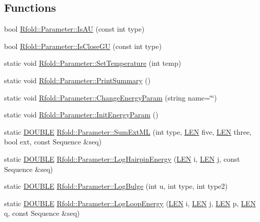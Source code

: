 \subsection*{Functions}
\begin{DoxyCompactItemize}
\item 
bool \hyperlink{namespace_rfold_1_1_parameter_a82faf0dc317bb70000edd3f34bc467b9}{Rfold\+::\+Parameter\+::\+Is\+A\+U} (const int type)
\item 
bool \hyperlink{namespace_rfold_1_1_parameter_a0ed77a73e79acb5e23fbb8f0a93e915f}{Rfold\+::\+Parameter\+::\+Is\+Close\+G\+U} (const int type)
\item 
static void \hyperlink{namespace_rfold_1_1_parameter_a308e1549312d4c50c9701331ef6acf7e}{Rfold\+::\+Parameter\+::\+Set\+Temperature} (int temp)
\item 
static void \hyperlink{namespace_rfold_1_1_parameter_af2fc6f49adcbd2c489ef4afa27c096dc}{Rfold\+::\+Parameter\+::\+Print\+Summary} ()
\item 
static void \hyperlink{namespace_rfold_1_1_parameter_a5d691fc3fd4d8c3633b25eb48ab151d0}{Rfold\+::\+Parameter\+::\+Change\+Energy\+Param} (string name=\char`\"{}\char`\"{})
\item 
static void \hyperlink{namespace_rfold_1_1_parameter_a3c977c57f1a40be353e62f7292eff9e4}{Rfold\+::\+Parameter\+::\+Init\+Energy\+Param} ()
\item 
static \hyperlink{energy__const_8hh_a8747af38b86aa2bbcda2f1b1aa0888c2}{D\+O\+U\+B\+L\+E} \hyperlink{namespace_rfold_1_1_parameter_a56e65afc08cd0ac6ec2af3a0bac07c0d}{Rfold\+::\+Parameter\+::\+Sum\+Ext\+M\+L} (int type, \hyperlink{energy__const_8hh_a05b49c662c073f89e86804f7856622a0}{L\+E\+N} five, \hyperlink{energy__const_8hh_a05b49c662c073f89e86804f7856622a0}{L\+E\+N} three, bool ext, const Sequence \&seq)
\item 
static \hyperlink{energy__const_8hh_a8747af38b86aa2bbcda2f1b1aa0888c2}{D\+O\+U\+B\+L\+E} \hyperlink{namespace_rfold_1_1_parameter_a59afd89fc8f4ec5e7fa0ef0a3e56f302}{Rfold\+::\+Parameter\+::\+Log\+Hairpin\+Energy} (\hyperlink{energy__const_8hh_a05b49c662c073f89e86804f7856622a0}{L\+E\+N} i, \hyperlink{energy__const_8hh_a05b49c662c073f89e86804f7856622a0}{L\+E\+N} j, const Sequence \&seq)
\item 
static \hyperlink{energy__const_8hh_a8747af38b86aa2bbcda2f1b1aa0888c2}{D\+O\+U\+B\+L\+E} \hyperlink{namespace_rfold_1_1_parameter_a84c12e24c819863c0a7de43605f07053}{Rfold\+::\+Parameter\+::\+Log\+Bulge} (int u, int type, int type2)
\item 
static \hyperlink{energy__const_8hh_a8747af38b86aa2bbcda2f1b1aa0888c2}{D\+O\+U\+B\+L\+E} \hyperlink{namespace_rfold_1_1_parameter_a1c0e2f8427cf288a00fc615429933918}{Rfold\+::\+Parameter\+::\+Log\+Loop\+Energy} (\hyperlink{energy__const_8hh_a05b49c662c073f89e86804f7856622a0}{L\+E\+N} i, \hyperlink{energy__const_8hh_a05b49c662c073f89e86804f7856622a0}{L\+E\+N} j, \hyperlink{energy__const_8hh_a05b49c662c073f89e86804f7856622a0}{L\+E\+N} p, \hyperlink{energy__const_8hh_a05b49c662c073f89e86804f7856622a0}{L\+E\+N} q, const Sequence \&seq)
\end{DoxyCompactItemize}



